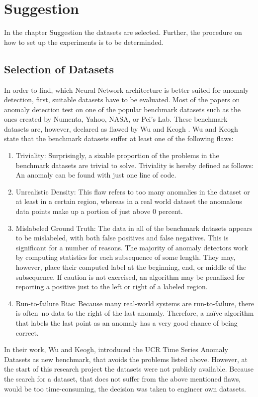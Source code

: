 \chapter{Suggestion}
In the chapter Suggestion the datasets are selected. Further, the procedure on how to set up the experiments is to be determinded.

\section{Selection of Datasets}
In order to find, which Neural Network architecture is better suited for anomaly detection, first, suitable datasets have to be evaluated. Most of the papers on anomaly detection test on one of the popular benchmark datasets such as the ones created by Numenta, Yahoo, NASA, or Pei's Lab. These benchmark datasets are, however, declared as flawed by Wu and Keogh \parencite{YEAR}. Wu and Keogh state that the benchmark datasets suffer at least one of the following flaws:

\begin{enumerate}
	\item Triviality: Surprisingly, a sizable proportion of the problems in the benchmark datasets are trivial to solve. Triviality is hereby defined as follows: An anomaly can be found with just one line of code.
	\item Unrealistic Density: This flaw refers to too many anomalies in the dataset or at least in a certain region, whereas in a real world dataset the anomalous data points make up a portion of just above 0 percent.   
	\item Mislabeled Ground Truth: The data in all of the benchmark datasets appears to be mislabeled, with both false positives and false negatives. This is significant for a number of reasons. The majority of anomaly detectors work by computing statistics for each subsequence of some length. They may, however, place their computed label at the beginning, end, or middle of the subsequence. If caution is not exercised, an algorithm may be penalized for reporting a positive just to the left or right of a labeled region.
	\item Run-to-failure Bias: Because many real-world systems are run-to-failure, there is often no data to the right of the last anomaly. Therefore, a naïve algorithm that labels the last point as an anomaly has a very good chance of being correct.
\end{enumerate}

In their work, Wu and Keogh, introduced the UCR Time Series Anomaly Datasets as new benchmark, that avoids the problems listed above. However, at the start of this research project the datasets were not publicly available. Because the search for a dataset, that does not suffer from the above mentioned flaws, would be too time-consuming, the decision was taken to engineer own datasets.\\
 \\
 

